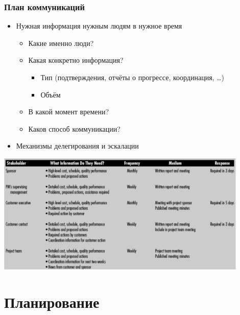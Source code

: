 \documentclass{../../slides-style}
\begin{document}
    \begin{frame}
        \frametitle{План коммуникаций}
        \begin{itemize}
            \item Нужная информация нужным людям в нужное время
            \begin{itemize}
                \item Какие именно люди?
                \item Какая конкретно информация?
                \begin{itemize}
                    \item Тип (подтверждения, отчёты о прогрессе, координация, …)
                    \item Объём
                \end{itemize}
                \item В какой момент времени?
                \item Каков способ коммуникации?
            \end{itemize}
            \item Механизмы делегирования и эскалации
        \end{itemize}
    \end{frame}

    \begin{frame}
        \begin{center}
            \includegraphics[width=0.9\textwidth]{communicationPlan.png}
        \end{center}
    \end{frame}

    \section{Планирование}
\end{document}
